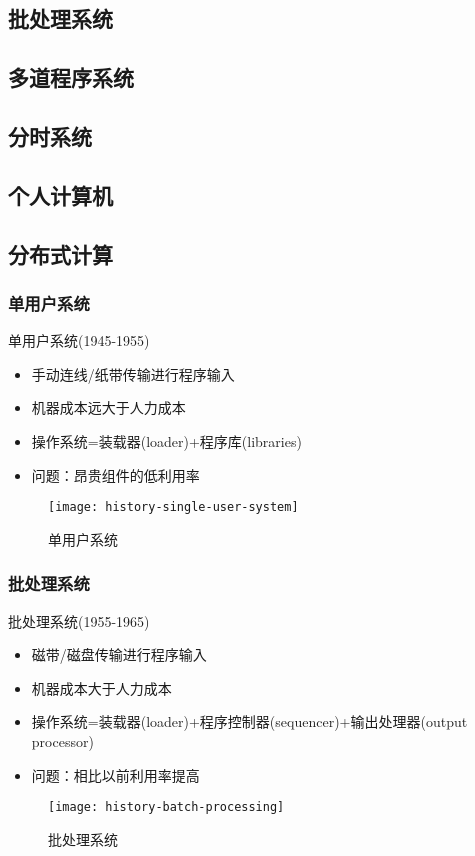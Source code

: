 \subsection{批处理系统}
\subsection{多道程序系统}
\subsection{分时系统}
\subsection{个人计算机}
\subsection{分布式计算}

\begin{frame}[plain]

\frametitle{单用户系统}

单用户系统(1945-1955)
\begin{itemize}
\item 手动连线/纸带传输进行程序输入
\item 机器成本远大于人力成本	
\item 操作系统=装载器(loader)+程序库(libraries)
\item 问题：昂贵组件的低利用率
\end{itemize}

	\begin{figure}
	\centering
	\texttt{[image: history-single-user-system]}
	\caption{单用户系统}
\end{figure}

\end{frame}



\begin{frame}[plain]
	
	\frametitle{批处理系统}
	
	批处理系统(1955-1965)
	\begin{itemize}
		\item 磁带/磁盘传输进行程序输入
		\item 机器成本大于人力成本	
		\item 操作系统=装载器(loader)+程序控制器(sequencer)+输出处理器(output processor)
		\item 问题：相比以前利用率提高
	\end{itemize}
	
	\begin{figure}
		\centering
		\texttt{[image: history-batch-processing]}
		\caption{批处理系统}
	\end{figure}
	
\end{frame}


